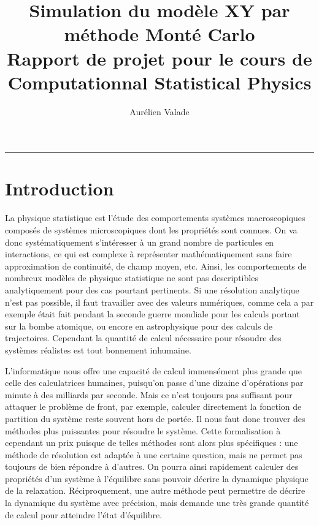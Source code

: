 \documentclass[a4paper, 11pt]{article}
\title{Simulation du modèle XY par méthode Monté Carlo \medskip \\ 
       \Large Rapport de projet pour le cours de Computationnal Statistical Physics }
\author{Aurélien Valade}
\date{}
\begin{document}
\maketitle

{\centering \rule{\textwidth}{.5pt} }

\section*{Introduction}

La physique statistique est l'étude des comportements systèmes macroscopiques composés de systèmes
microscopiques dont les propriétés sont connues. On va donc systématiquement s'intéresser à un grand
nombre de particules en interactions, ce qui est complexe à représenter mathématiquement sans faire
approximation de continuité, de champ moyen, etc. Ainsi, les comportements de nombreux modèles de
physique statistique ne sont pas descriptibles analytiquement pour des cas pourtant pertinents.  Si
une résolution analytique n'est pas possible, il faut travailler avec des valeurs numériques, comme
cela a par exemple était fait pendant la seconde guerre mondiale pour les calculs portant sur la
bombe atomique, ou encore en astrophysique pour des calculs de trajectoires.  Cependant la quantité
de calcul nécessaire pour résoudre des systèmes réalistes est tout bonnement inhumaine.

L'informatique nous offre une capacité de calcul immensément plus grande que celle des calculatrices
humaines, puisqu'on passe d'une dizaine d'opérations par minute à des milliards par seconde. Mais ce
n'est toujours pas suffisant pour attaquer le problème de front, par exemple, calculer directement
la fonction de partition du système reste souvent hors de portée. Il nous faut donc trouver des
méthodes plus puissantes pour résoudre le système. Cette formalisation à cependant un prix puisque
de telles méthodes sont alors plus spécifiques : une méthode de résolution est adaptée à une
certaine question, mais ne permet pas toujours de bien répondre à d'autres. On pourra ainsi
rapidement calculer des propriétés d'un système à l'équilibre sans pouvoir décrire la dynamique
physique de la relaxation. Réciproquement, une autre méthode peut permettre de décrire la dynamique
du système avec précision, mais demande une très grande quantité de calcul pour atteindre l'état
d'équilibre. 
\end{document}

